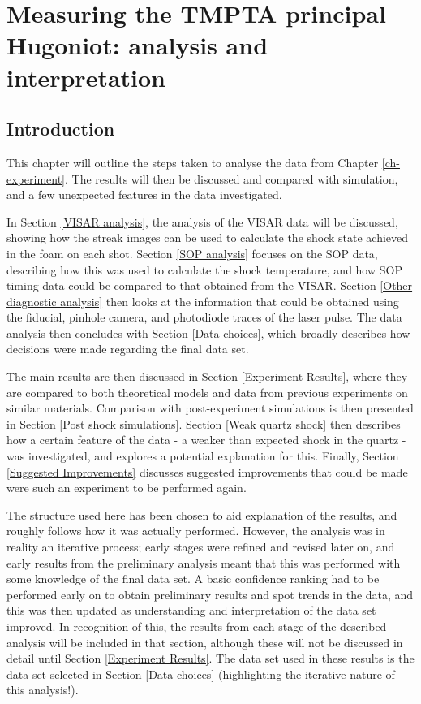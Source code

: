 \chapter{\label{ch-experimentAnalysis} Measuring the TMPTA principal Hugoniot: analysis and interpretation}

\minitoc

\section{Introduction}

This chapter will outline the steps taken to analyse the data from Chapter \ref{ch-experiment}. The results will then be discussed and compared with simulation, and a few unexpected features in the data investigated. 

In Section \ref{VISAR analysis}, the analysis of the VISAR data will be discussed, showing how the streak images can be used to calculate the shock state achieved in the foam on each shot. Section \ref{SOP analysis} focuses on the SOP data, describing how this was used to calculate the shock temperature, and how SOP timing data could be compared to that obtained from the VISAR. Section \ref{Other diagnostic analysis} then looks at the information that could be obtained using the fiducial, pinhole camera, and photodiode traces of the laser pulse. The data analysis then concludes with Section \ref{Data choices}, which broadly describes how decisions were made regarding the final data set.

The main results are then discussed in Section \ref{Experiment Results}, where they are compared to both theoretical models and data from previous experiments on similar materials. Comparison with post-experiment simulations is then presented in Section \ref{Post shock simulations}. Section \ref{Weak quartz shock} then describes how a certain feature of the data - a weaker than expected shock in the quartz - was investigated, and explores a potential explanation for this. Finally, Section \ref{Suggested Improvements} discusses suggested improvements that could be made were such an experiment to be performed again.

The structure used here has been chosen to aid explanation of the results, and roughly follows how it was actually performed. However, the analysis was in reality an iterative process; early stages were refined and revised later on, and early results from the preliminary analysis meant that this was performed with some knowledge of the final data set. A basic confidence ranking had to be performed early on to obtain preliminary results and spot trends in the data, and this was then updated as understanding and interpretation of the data set improved. In recognition of this, the results from each stage of the described analysis will be included in that section, although these will not be discussed in detail until Section \ref{Experiment Results}. The data set used in these results is the data set selected in Section \ref{Data choices} (highlighting the iterative nature of this analysis!).

